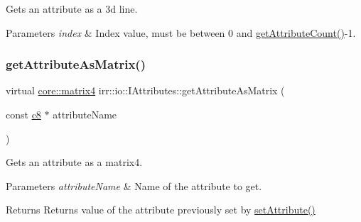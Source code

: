 Gets an attribute as a 3d line. 


\begin{DoxyParams}{Parameters}
{\em index} & Index value, must be between 0 and \hyperlink{classirr_1_1io_1_1IAttributes_a796bdd9440ee7ba0b6742a90a82870b6}{get\+Attribute\+Count()}-\/1. \\
\hline
\end{DoxyParams}
\mbox{\label{classirr_1_1io_1_1IAttributes_a0329ce7827096c56f3c7e905afe04ced}} 
\subsubsection{\texorpdfstring{get\+Attribute\+As\+Matrix()}{getAttributeAsMatrix()}\hspace{0.1cm}{\footnotesize\ttfamily [1/2]}}
{\footnotesize\ttfamily virtual \hyperlink{namespaceirr_1_1core_a73fa92e638c5ca97efd72da307cc9b65}{core\+::matrix4} irr\+::io\+::\+I\+Attributes\+::get\+Attribute\+As\+Matrix (\begin{DoxyParamCaption}\item[{const \hyperlink{namespaceirr_a9395eaea339bcb546b319e9c96bf7410}{c8} $\ast$}]{attribute\+Name }\end{DoxyParamCaption})\hspace{0.3cm}{\ttfamily [pure virtual]}}



Gets an attribute as a matrix4. 


\begin{DoxyParams}{Parameters}
{\em attribute\+Name} & Name of the attribute to get. \\
\hline
\end{DoxyParams}
\begin{DoxyReturn}{Returns}
Returns value of the attribute previously set by \hyperlink{classirr_1_1io_1_1IAttributes_a03fa31acb481ae23678676cc183f09a6}{set\+Attribute()} 
\end{DoxyReturn}
\mbox{\label{classirr_1_1io_1_1IAttributes_aaceb2fc0fca684d941918ce18d876336}} 
